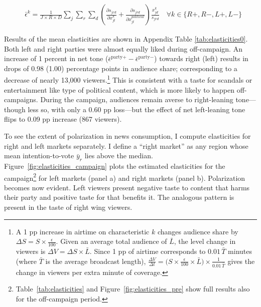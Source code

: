 \documentclass[12pt]{article}
\begin{document}
	
	\begin{equation}\label{eq:elasticities}
		\begin{aligned}
			& \bar{\epsilon}^k= \frac{1}{J\times R \times D}\sum_{j}\sum_{r} \sum_{d} \left(\frac{\partial s_{jrd}}{\partial x_{jt}^k} +  \frac{\partial s_{jrd}}{\partial x_{jt}^{political}} \right) \frac{x_{jd}^k}{s_{jrd}}    \quad \forall k \in \{R+,R-,L+,L-\}
		\end{aligned}
	\end{equation}             
	
	
	
	Results of the mean elasticities are shown in Appendix Table \ref{tab:elasticities0}.	Both left and right parties were almost equally liked during off-campaign. An increase of 1 percent in net tone ($\bar{\epsilon}^{\text{party}+}-\bar{\epsilon}^{\text{party}-}$) towards right (left) results in drops of 0.98 (1.00) percentage points in audience share; corresponding to a decrease of nearly 13,000 viewers.\footnote{A 1 pp increase in airtime on characteristic $k$ changes audience share by $\Delta S = S \times \tfrac{\epsilon}{100}$. Given an average total audience of $\bar{L}$, the level change in viewers is $\Delta V = \Delta S \times \bar{L}$. Since 1 pp of airtime corresponds to $0.01\,\bar{T}$ minutes (where $\bar{T}$ is the average broadcast length), $\tfrac{\Delta V}{\Delta t} = \bigl(S \times \tfrac{\epsilon}{100} \times \bar{L}\bigr) \times \tfrac{1}{0.01\,\bar{T}}$ gives the change in viewers per extra minute of coverage.} This is consistent with a taste for scandals or entertainment like type of political content, which is more likely to happen off-campaigns. During the campaign, audiences remain averse to right-leaning tone—though less so, with only a 0.60 pp loss—but the effect of net left-leaning tone flips to 0.09 pp increase (867 viewers).
	
	
	To see the extent of polarization in news consumption, I  compute elasticities for right and left markets separately. I define a “right market” as any region whose mean intention-to-vote $\bar{y}_r$ lies above the median. 
	 Figure~\ref{fig:elasticities_campaign} plots the estimated elasticities for the campaign\footnote{Table~\ref{tab:elasticities} and 	 Figure~\ref{fig:elasticities_pre} show full results also for the off-campaign period. } for left markets (panel a) and right markets (panel b).	Polarization becomes now evident. Left viewers present negative taste to content that harms their party and positive taste for that benefits it. The analogous pattern is present in the taste of right wing viewers. 
	 
\end{document}
